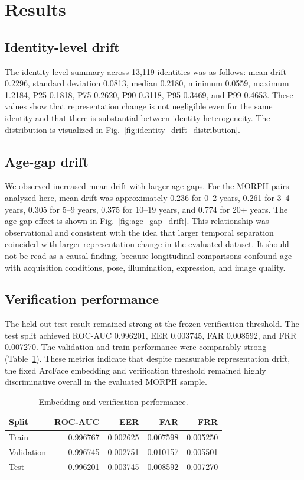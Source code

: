\documentclass[conference]{IEEEtran}
\begin{document}
\section{Results}
\label{sec:results}
\subsection{Identity-level drift}
The identity-level summary across 13,119 identities was as follows: mean drift 0.2296, standard deviation 0.0813, median 0.2180, minimum 0.0559, maximum 1.2184, P25 0.1818, P75 0.2620, P90 0.3118, P95 0.3469, and P99 0.4653. These values show that representation change is not negligible even for the same identity and that there is substantial between-identity heterogeneity. The distribution is visualized in Fig.~\ref{fig:identity_drift_distribution}.

\subsection{Age-gap drift}
We observed increased mean drift with larger age gaps. For the MORPH pairs analyzed here, mean drift was approximately 0.236 for 0--2 years, 0.261 for 3--4 years, 0.305 for 5--9 years, 0.375 for 10--19 years, and 0.774 for 20+ years. The age-gap effect is shown in Fig.~\ref{fig:age_gap_drift}. This relationship was observational and consistent with the idea that larger temporal separation coincided with larger representation change in the evaluated dataset. It should not be read as a causal finding, because longitudinal comparisons confound age with acquisition conditions, pose, illumination, expression, and image quality.

\subsection{Verification performance}
The held-out test result remained strong at the frozen verification threshold. The test split achieved ROC-AUC 0.996201, EER 0.003745, FAR 0.008592, and FRR 0.007270. The validation and train performance were comparably strong (Table~\ref{tab:verification-performance}). These metrics indicate that despite measurable representation drift, the fixed ArcFace embedding and verification threshold remained highly discriminative overall in the evaluated MORPH sample.

\begin{table}[t]
\centering
\caption{Embedding and verification performance.}
\label{tab:verification-performance}
\begin{tabular}{@{}lrrrr@{}}
\toprule
Split & ROC-AUC & EER & FAR & FRR \\
\midrule
Train & 0.996767 & 0.002625 & 0.007598 & 0.005250 \\
Validation & 0.996745 & 0.002751 & 0.010157 & 0.005501 \\
Test & 0.996201 & 0.003745 & 0.008592 & 0.007270 \\
\bottomrule
\end{tabular}
\end{table}
\end{document}
